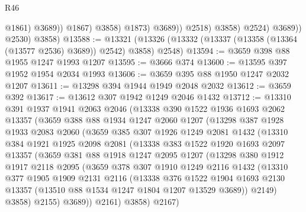 \begin{lexlean}{R46}
\begin{coremodule}
                                  @1861)
                                @3689))
                            @1867)
                          @3858)
                        @1873)
                      @3689))
                  @2518)
                @3858)
              @2524)
            @3689))
        @2530)
      @3858)
@13588 := @13321 (@13326 (@13332 (@13337 (@13358 (@13364 (@13577 @2536) @3689)) @2542) @3858) @2548)
@13594 := @3659 @398 @88 @1955 @1247 @1993 @1207
@13595 := @3666 @374
@13600 := @13595 @397 @1952 @1954 @2034 @1993
@13606 := @3659 @395 @88 @1950 @1247 @2032 @1207
@13611 := @13298 @394 @1944 @1949 @2048 @2032
@13612 := @3659 @392
@13617 := @13612 @307 @1942 @1249 @2046 @1432
@13712 := @13310
    @391
    @1937
    @1941
    @2063
    @2046
    (@13338
      @390
      @1522
      @1936
      @1693
      @2062
      @13357
      (@3659
        @388
        @88
        @1934
        @1247
        @2060
        @1207
        (@13298
          @387
          @1928
          @1933
          @2083
          @2060
          (@3659
            @385
            @307
            @1926
            @1249
            @2081
            @1432
            (@13310
              @384
              @1921
              @1925
              @2098
              @2081
              (@13338
                @383
                @1522
                @1920
                @1693
                @2097
                @13357
                (@3659
                  @381
                  @88
                  @1918
                  @1247
                  @2095
                  @1207
                  (@13298
                    @380
                    @1912
                    @1917
                    @2118
                    @2095
                    (@3659
                      @378
                      @307
                      @1910
                      @1249
                      @2116
                      @1432
                      (@13310
                        @377
                        @1905
                        @1909
                        @2131
                        @2116
                        (@13338
                          @376
                          @1522
                          @1904
                          @1693
                          @2130
                          @13357
                          (@13510 @88 @1534 @1247 @1804 @1207 @13529 @3689))
                        @2149)
                      @3858)
                    @2155)
                  @3689))
              @2161)
            @3858)
          @2167)

\end{coremodule}
\end{lexlean}
